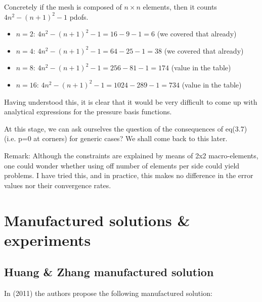 Concretely if the mesh is composed of $n \times n$ elements, then it 
counts $4n^2 - (n+1)^2  -1$ pdofs.
\begin{itemize}
\item $n=2$:  $4n^2 - (n+1)^2 -1= 16 -9 -1=6 $ (we covered that already)
\item $n=4$:  $4n^2 - (n+1)^2 -1= 64 -25 -1=38 $ (we covered that already)
\item $n=8$:  $4n^2 - (n+1)^2 -1= 256 -81 -1=174 $ (value in the table)
\item $n=16$: $4n^2 - (n+1)^2 -1= 1024 -289 -1= 734$ (value in the table)
\end{itemize}

Having understood this, it is clear that it would be very difficult 
to come up with analytical expressions for the pressure basis functions. 

At this stage, we can ask ourselves the question of the consequences of eq(3.7) (i.e. p=0 at corners) 
for generic cases? We shall come back to this later.

Remark: Although the constraints are explained by means of 2x2 macro-elements, 
one could wonder whether using off number of elements per side could yield problems.
I have tried this, and in practice, this makes no difference in the error values nor their 
convergence rates.

\newpage
\section*{Manufactured solutions \& experiments}

\subsection*{Huang \& Zhang manufactured solution}

In \textcite{huzh11} (2011) the authors propose the 
following manufactured solution:

